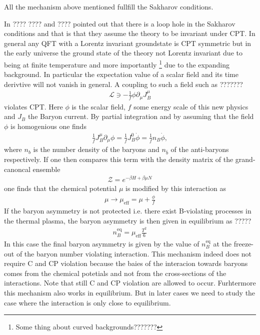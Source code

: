 \documentclass[13pt,a4paper,twoside,titlepage]{article}
\begin{document}
All the mechanism above mentioned fullfill the Sakharov conditions.

In ???? ???? and ???? pointed out that there is a loop hole in the Sakharov conditions
and that is that they assume the theory to be invariant under CPT.
In general any QFT with a Lorentz invariant groundstate is CPT symmetric but in the early universe the ground state of the theory not Lorentz invariant due to being at finite temperature and more importantly \footnote{Some thing about curved backgrounds???????}
due to the expanding background. In particular the expectation value of a scalar field and its time derivtive will not vanish in general. A coupling to such a field such as ???????
\begin{align}
    \mathcal{L} \ni - \frac{1}{f} \phi \partial_\mu J^\mu_B
\end{align}
violates CPT. Here $\phi$ is the scalar field, $f$ some energy scale of this new physics and $J_B$ the Baryon current.
By partial integration and by assuming that the field $\phi$ is homogenious one finds
\begin{align}
    \frac{1}{f} J_B^\mu \partial_\mu \phi = \frac{1}{f} J_B^0 \dot{\phi}
    = \frac{1}{f} n_B \dot{\phi},
\end{align}
where $n_b$ is the number density of the baryons and $n_{\bar{b}}$ of the anti-baryons respectively.
If one then compares this term with the density matrix of the grand-canoncal ensemble
\begin{align}
    \mathcal{Z} = e^{-\beta H + \beta \mu N}
\end{align}
one finds that the chemical potential $\mu$ is modified by this
interaction as
\begin{align}
    \mu \to \mu_\mathrm{eff} = \mu + \frac{\phi}{f}
\end{align}
If the baryon asymmetry is not protected i.e. there exist B-violating processes in the thermal plasma, the baryon asymmetry is then given in equilibrium as ?????
\begin{align}
    n_B^\mathrm{eq} = \mu_\mathrm{eff} \frac{T^2}{6}
\end{align}
In this case the final baryon asymmetry is given by the value of $n^\mathrm{eq}_B$ at the freeze-out of the baryon number violating interaction.
This mechanism indeed does not require C and CP violation because the baies of the interacion towards baryons comes from the chemical potetials and not from the cross-sections of the interactions.
Note that still C and CP violation are allowed to occur.
Furhtermore this mechanism also works in equilibrium.
But in later cases we need to study the case where the interaction is only close to equilibrium.
\end{document}
